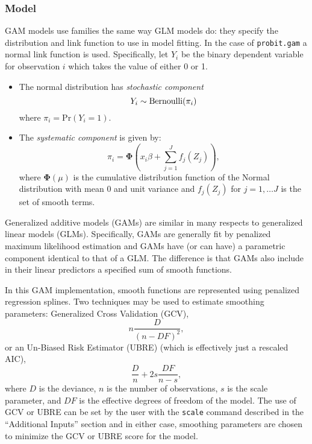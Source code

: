 \subsubsection{Model}


GAM models use families the same way GLM models do: they specify the distribution and link function to use in model fitting.  In the case of {\tt probit.gam} a normal link function is used. Specifically, let $Y_{i}$ be the binary dependent variable for observation $i$ which takes the value of either 0 or 1.
\begin{itemize}
\item The normal distribution has \emph{stochastic component}  
\begin{equation*}
Y_{i}  \sim \text{Bernoulli} ( \pi_{i})\\
\end{equation*}
where $\pi_{i} = \text{Pr}(Y_{i} = 1)$.
\item The \emph{systematic component} is given by:
\begin{equation*}
\pi_{i} = \pmb{\Phi} \left( x_{i}\beta + \sum_{j=1}^{J} f_j(Z_j) \right),
\end{equation*}
where $ \pmb{\Phi}(\mu)$ is the cumulative distribution function of the Normal distribution with mean 0 and unit variance and $f_j(Z_j)$ for $j=1, \ldots J$ is the set of smooth terms.
\end{itemize}

Generalized additive models (GAMs) are similar in many respects to generalized linear models (GLMs). Specifically, GAMs are generally fit by penalized maximum likelihood estimation and GAMs have (or can have) a parametric component identical to that of a GLM. The difference is that GAMs also include in their linear predictors a specified sum of smooth functions. 

In this GAM implementation, smooth functions are represented using penalized regression splines. Two techniques may be used to estimate smoothing parameters: Generalized Cross Validation (GCV),
\begin{equation}
n \frac{D}{(n-DF)^2},
\end{equation}
or an Un-Biased Risk Estimator (UBRE) (which is effectively just a rescaled AIC),
\begin{equation}
\frac{D}{n} + 2 s \frac{DF}{n-s},
\end{equation}
where $D$ is the deviance, $n$ is the number of observations, $s$ is the scale parameter, and $DF$ is the effective degrees of freedom of the model. The use of GCV or UBRE can be set by the user with the {\tt scale} command described in the ``Additional Inputs'' section and in either case, smoothing parameters are chosen to minimize the GCV or UBRE score for the model. 

